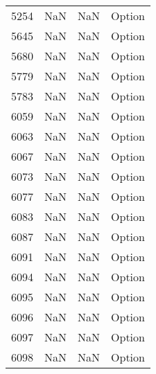 \begin{tabular}{llll}
5254 &                   NaN &                        NaN &                                    Option \\
5645 &                   NaN &                        NaN &                                    Option \\
5680 &                   NaN &                        NaN &                                    Option \\
5779 &                   NaN &                        NaN &                                    Option \\
5783 &                   NaN &                        NaN &                                    Option \\
6059 &                   NaN &                        NaN &                                    Option \\
6063 &                   NaN &                        NaN &                                    Option \\
6067 &                   NaN &                        NaN &                                    Option \\
6073 &                   NaN &                        NaN &                                    Option \\
6077 &                   NaN &                        NaN &                                    Option \\
6083 &                   NaN &                        NaN &                                    Option \\
6087 &                   NaN &                        NaN &                                    Option \\
6091 &                   NaN &                        NaN &                                    Option \\
6094 &                   NaN &                        NaN &                                    Option \\
6095 &                   NaN &                        NaN &                                    Option \\
6096 &                   NaN &                        NaN &                                    Option \\
6097 &                   NaN &                        NaN &                                    Option \\
6098 &                   NaN &                        NaN &                                    Option \\

\end{tabular}
